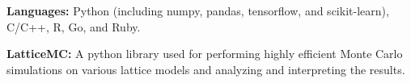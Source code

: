 

\begin{cvparagraph}

    \vspace{2.5ex}
    \begin{cvitems}
        \item {\textbf{Languages:} Python (including numpy, pandas, tensorflow,
                and scikit-learn), C/C++, R, Go, and Ruby.}
        \item {\textbf{LatticeMC:} A python library used for performing
                highly efficient Monte Carlo simulations on various lattice
                models and analyzing and interpreting the results.}
   \end{cvitems}

\end{cvparagraph}


